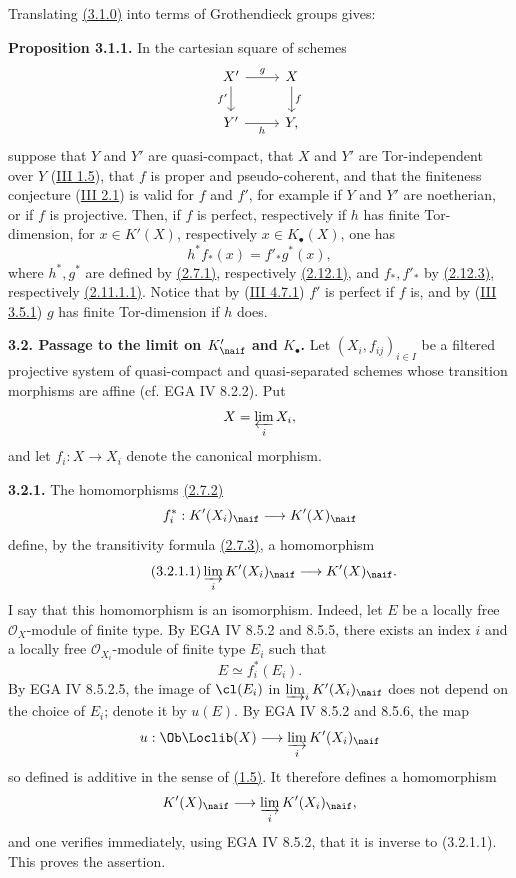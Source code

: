 Translating \hyperlink{sga6.e04.prop.3-1-0}{(3.1.0)} into terms of Grothendieck groups gives:

\textbf{Proposition 3.1.1.} In the cartesian square of schemes
\[
\begin{tikzcd}
X' \arrow[r,"g"]\arrow[d,"f'"'] & X\arrow[d,"f"]\\
Y' \arrow[r,"h"'] & Y,
\end{tikzcd}
\]
suppose that \(Y\) and \(Y'\) are quasi-compact, that \(X\) and \(Y'\) are Tor-independent over \(Y\) (\hyperlink{sga6.e03.def.1-5}{III 1.5}), that \(f\) is proper and pseudo-coherent, and that the finiteness conjecture (\hyperlink{sga6.e03.conj.2-1}{III 2.1}) is valid for \(f\) and \(f'\), for example if \(Y\) and \(Y'\) are noetherian, or if \(f\) is projective. Then, if \(f\) is perfect, respectively if \(h\) has finite Tor-dimension, for \(x\in K'(X)\), respectively \(x\in K_{\bullet}(X)\), one has
\[
 h^* f_*(x)=f'_* g^*(x),
\]
where \(h^*,g^*\) are defined by \hyperlink{sga6.e04.eq.2-7-1}{(2.7.1)}, respectively \hyperlink{sga6.e04.eq.2-12-1}{(2.12.1)}, and \(f_*,f'_*\) by \hyperlink{sga6.e04.eq.2-12-3}{(2.12.3)}, respectively \hyperlink{sga6.e04.eq.2-11-1-1}{(2.11.1.1)}. Notice that by (\hyperlink{sga6.e03.cor.4-7-1}{III 4.7.1}) \(f'\) is perfect if \(f\) is, and by (\hyperlink{sga6.e03.cor.3-5-1}{III 3.5.1}) \(g\) has finite Tor-dimension if \(h\) does.

\textbf{3.2. Passage to the limit on \(K'_{\naif}\) and \(K_{\bullet}\).} Let \((X_i,f_{ij})_{i\in I}\) be a filtered projective system of quasi-compact and quasi-separated schemes whose transition morphisms are affine (cf. EGA IV 8.2.2). Put
\[
 X=\varprojlim_i X_i,
\]
and let \(f_i:X\to X_i\) denote the canonical morphism.

\textbf{3.2.1.} The homomorphisms \hyperlink{sga6.e04.eq.2-7-2}{(2.7.2)}
\[
 f_i^*:K'(X_i)_{\naif}\longrightarrow K'(X)_{\naif}
\]
define, by the transitivity formula \hyperlink{sga6.e04.eq.2-7-3}{(2.7.3)}, a homomorphism
\begin{equation}\tag{3.2.1.1}
 \varinjlim_i K'(X_i)_{\naif}\longrightarrow K'(X)_{\naif}.
\end{equation}
I say that this homomorphism is an isomorphism. Indeed, let \(E\) be a locally free \(\mathcal O_X\)-module of finite type. By EGA IV 8.5.2 and 8.5.5, there exists an index \(i\) and a locally free \(\mathcal O_{X_i}\)-module of finite type \(E_i\) such that
\[
 E\simeq f_i^*(E_i).
\]
By EGA IV 8.5.2.5, the image of \(\cl(E_i)\) in \(\varinjlim_i K'(X_i)_{\naif}\) does not depend on the choice of \(E_i\); denote it by \(u(E)\). By EGA IV 8.5.2 and 8.5.6, the map
\[
 u:\Ob\Loclib(X)\longrightarrow \varinjlim_i K'(X_i)_{\naif}
\]
so defined is additive in the sense of \hyperlink{sga6.e04.para.1-5}{(1.5)}. It therefore defines a homomorphism
\[
 K'(X)_{\naif}\longrightarrow \varinjlim_i K'(X_i)_{\naif},
\]
and one verifies immediately, using EGA IV 8.5.2, that it is inverse to (3.2.1.1). This proves the assertion.

